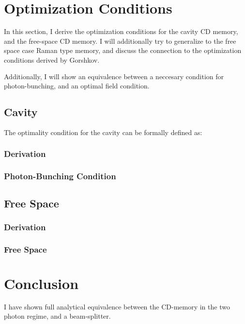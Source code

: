 \documentclass[12pt]{article}
\begin{document}
\section{Optimization Conditions}

In this section, I derive the optimization conditions for the cavity CD memory, and the free-space CD memory. I will additionally try to generalize to the free space case Raman type memory, and discuss the connection to the optimization conditions derived by Gorshkov.

Additionally, I will show an equivalence between a neccesary condition for photon-bunching, and an optimal field condition.

\subsection{Cavity}
The optimality condition for the cavity can be formally defined as:
\subsubsection{Derivation}
\subsubsection{Photon-Bunching Condition}
\subsection{Free Space}
\subsubsection{Derivation}
\subsubsection{Free Space}
\section{Conclusion}

I have shown full analytical equivalence between the CD-memory in the two photon regime, and a beam-splitter.
\end{document}
